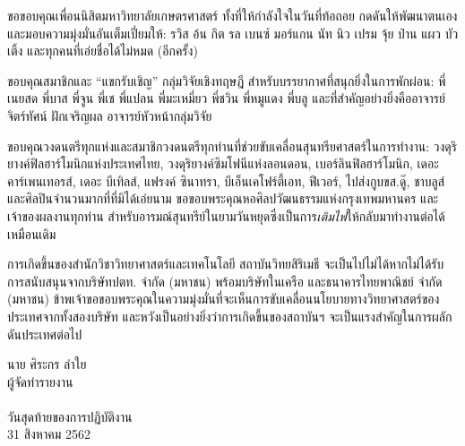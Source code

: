 \documentclass[16pt,a4]{internshipreport}
\begin{document}
ขอขอบคุณเพื่อนนิสิตมหาวิทยาลัยเกษตรศาสตร์ ทั้งที่ให้กำลังใจในวันที่ท้อถอย
กดดันให้พัฒนาตนเอง และมอบความมุ่งมั่นอันเต็มเปี่ยมให้: รวิส อ้น กิต รล เบนซ์ มอร์แกน นัท นิว เปรม จุ้ย ป่าน แผว บัว เติ้ง
และทุกคนที่เอ่ยชื่อได้ไม่หมด (อีกครั้ง)

ขอบคุณสมาชิกและ ``แขกรับเชิญ'' กลุ่มวิจัยเชิงทฤษฎี สำหรับบรรยากาศที่สนุกยิ่งในการพักผ่อน: พี่เนยสด พี่บาส พี่จูน พี่เช พี่แปลน พี่มะเหมี่ยว พี่ชวิน พี่หมูแดง พี่บลู
และที่สำคัญอย่างยิ่งคืออาจารย์จิตร์ทัศน์ ฝักเจริญผล อาจารย์หัวหน้ากลุ่มวิจัย

ขอบคุณวงดนตรีทุกแห่งและสมาชิกวงดนตรีทุกท่านที่ช่วยขับเคลื่อนสุนทรียศาสตร์ในการทำงาน: วงดุริยางค์ฟิลฮาร์โมนิกแห่งประเทศไทย, วงดุริยางค์ซิมโฟนีแห่งลอนดอน, เบอร์ลินฟิลฮาร์โมนิก, เดอะ คาร์เพนเทอรส์, เดอะ บีเทิลส์, แฟรงค์ ซินาทรา, บีเอ็นเคโฟร์ตี้เอท, ฟีเวอร์, ไปส่งกูบขส.ดู๊, ชาบลูส์ และศิลปินจำนวนมากที่ที่มิได้เอ่ยนาม ขอขอบพระคุณหอศิลปวัฒนธรรมแห่งกรุงเทพมหานคร และเจ้าของผลงานทุกท่าน สำหรับอารมณ์สุนทรีย์ในยามวันหยุดซึ่งเป็นการ\textit{เติมไฟ}ให้กลับมาทำงานต่อได้เหมือนเดิม

การเกิดขึ้นของสำนักวิชาวิทยาศาสตร์และเทคโนโลยี สถาบันวิทยสิริเมธี จะเป็นไปไม่ได้หากไม่ได้รับการสนับสนุนจากบริษัทปตท. จำกัด (มหาชน) พร้อมบริษัทในเครือ และธนาคารไทยพาณิชย์ จำกัด (มหาชน)  ข้าพเจ้าขอขอบพระคุณในความมุ่งมั่นที่จะเห็นการขับเคลื่อนนโยบายทางวิทยาศาสตร์ของประเทศจากทั้งสองบริษัท และหวังเป็นอย่างยิ่งว่าการเกิดขี้นของสถาบันฯ จะเป็นแรงสำคัญในการผลักดันประเทศต่อไป

\vskip 20pt

\hfill\begin{minipage}
    {\dimexpr 5cm}
    \begin{center}
        นาย ศิระกร ลำใย\\
        ผู้จัดทำรายงาน\\~\\

        วันสุดท้ายของการปฏิบัติงาน\\
        31 สิงหาคม 2562
    \end{center}
    \xdef\tpd{\the\prevdepth}
\end{minipage}
\end{document}
